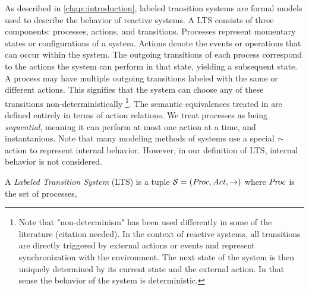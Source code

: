 %
\begin{isabellebody}%
%
%
\isadelimtheory
%
\endisadelimtheory
%
\isatagtheory
%
\endisatagtheory
{\isafoldtheory}%
%
\isadelimtheory
%
\endisadelimtheory
%
\isadelimdocument
%
\endisadelimdocument
%
\isatagdocument
%
\isamarkuptrue%
%
\endisatagdocument
{\isafolddocument}%
%
\isadelimdocument
%
\endisadelimdocument
%
\begin{isamarkuptext}%
\label{sec:LTS}%
\end{isamarkuptext}\isamarkuptrue%
%
\begin{isamarkuptext}%
As described in \cref{chap::introduction}, labeled transition systems are formal models used to describe the behavior of reactive systems.
A LTS consists of three components: processes, actions, and transitions. Processes represent momentary states or configurations of a system. 
Actions denote the events or operations that can occur within the system. The outgoing transitions of each process 
correspond to the actions the system can perform in that state, yielding a subsequent state. A process may have multiple outgoing transitions labeled with the same or different actions. This signifies that the system can choose any of these transitions non-deterministically
\footnote{Note that "non-determinism" has been used differently in some of the literature (citation needed). In the context of reactive systems, 
all transitions are directly triggered by external actions or events and represent synchronization with the environment.
The next state of the system is then uniquely determined by its current state and the external action. In that sense the behavior of the system is deterministic.}.
The semantic equivalences treated in \cite{GLABBEEK20013} are defined entirely in terms of action relations.
We treat processes as being \textit{sequential}, meaning it can perform at most one action at a time, and instantanious.
Note that many modeling methods of systems use a special $\tau$-action to represent internal behavior. However, in our definition of LTS, 
internal behavior is not considered.%
\end{isamarkuptext}\isamarkuptrue%
%
\isadelimdocument
%
\endisadelimdocument
%
\isatagdocument
%
\isamarkuptrue%
%
\endisatagdocument
{\isafolddocument}%
%
\isadelimdocument
%
\endisadelimdocument
%
\begin{isamarkuptext}%
A \textit{Labeled Transition System} (LTS) is a tuple $\mathcal{S} = (\mathit{Proc}, \mathit{Act}, \rightarrow)$ where $\mathit{Proc}$ is the set of processes, 

\end{isamarkuptext}
\end{isabellebody}
